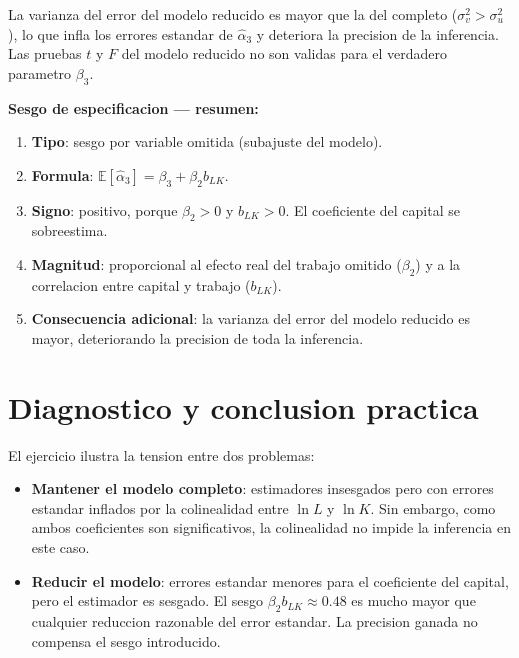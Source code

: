 \documentclass[12pt, letterpaper]{article}
\theoremstyle{remark}
\newcommand{\E}{\mathbb{E}}
\begin{document}
La varianza del error del modelo reducido es mayor que la del completo
($\sigma_v^2 > \sigma_u^2$), lo que infla los errores estandar de $\hat\alpha_3$
y deteriora la precision de la inferencia. Las pruebas $t$ y $F$ del modelo
reducido no son validas para el verdadero parametro $\beta_3$.

\begin{clave}
  \textbf{Sesgo de especificacion — resumen:}
  \begin{enumerate}[leftmargin=1.4em, itemsep=4pt]
    \item \textbf{Tipo}: sesgo por variable omitida (subajuste del modelo).
    \item \textbf{Formula}: $\E[\hat\alpha_3] = \beta_3 + \beta_2 b_{LK}$.
    \item \textbf{Signo}: positivo, porque $\beta_2 > 0$ y $b_{LK} > 0$.
      El coeficiente del capital se sobreestima.
    \item \textbf{Magnitud}: proporcional al efecto real del trabajo omitido
      ($\beta_2$) y a la correlacion entre capital y trabajo ($b_{LK}$).
    \item \textbf{Consecuencia adicional}: la varianza del error del modelo
      reducido es mayor, deteriorando la precision de toda la inferencia.
  \end{enumerate}
\end{clave}

\section{Diagnostico y conclusion practica}

El ejercicio ilustra la tension entre dos problemas:

\begin{itemize}[leftmargin=1.6em, itemsep=5pt]
  \item \textbf{Mantener el modelo completo}: estimadores insesgados pero
    con errores estandar inflados por la colinealidad entre $\ln L$ y $\ln K$.
    Sin embargo, como ambos coeficientes son significativos, la colinealidad
    no impide la inferencia en este caso.

  \item \textbf{Reducir el modelo}: errores estandar menores para el
    coeficiente del capital, pero el estimador es sesgado. El sesgo
    $\beta_2 b_{LK} \approx 0.48$ es mucho mayor que cualquier reduccion
    razonable del error estandar. La precision ganada no compensa el sesgo
    introducido.
\end{itemize}
\end{document}
